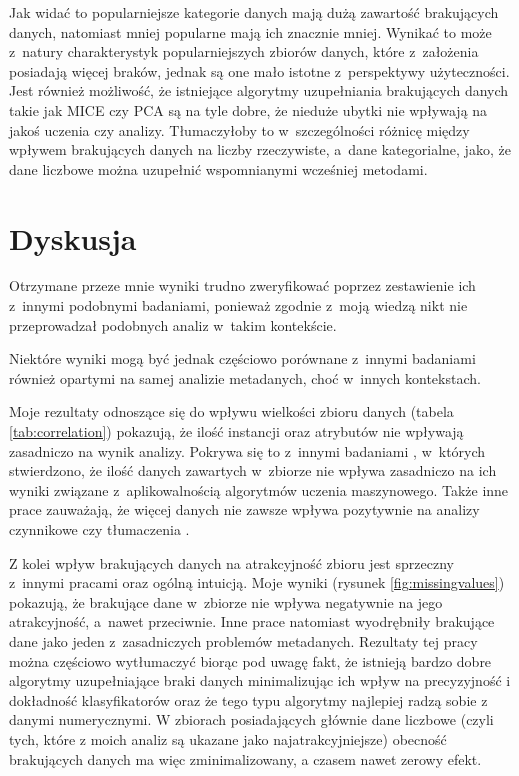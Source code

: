 Jak widać to popularniejsze kategorie danych mają dużą zawartość brakujących danych, natomiast mniej popularne mają ich znacznie mniej.
Wynikać to może z~natury charakterystyk popularniejszych zbiorów danych, które z~założenia posiadają więcej braków, jednak są one mało istotne z~perspektywy użyteczności.
Jest również możliwość, że istniejące algorytmy uzupełniania brakujących danych takie jak MICE czy PCA są na tyle dobre, że nieduże ubytki nie wpływają na jakoś uczenia czy analizy.
Tłumaczyłoby to w~szczególności różnicę między wpływem brakujących danych na liczby rzeczywiste, a~dane kategorialne, jako, że dane liczbowe można uzupełnić wspomnianymi wcześniej metodami.

\section{Dyskusja}

Otrzymane przeze mnie wyniki trudno zweryfikować poprzez zestawienie ich z~innymi podobnymi badaniami, ponieważ zgodnie z~moją wiedzą nikt nie przeprowadzał podobnych analiz w~takim kontekście.

Niektóre wyniki mogą być jednak częściowo porównane z~innymi badaniami również opartymi na samej analizie metadanych, choć w~innych kontekstach.

Moje rezultaty odnoszące się do wpływu wielkości zbioru danych (tabela \ref{tab:correlation}) pokazują, że ilość instancji oraz atrybutów nie wpływają zasadniczo na wynik analizy.
Pokrywa się to z~innymi badaniami \cite{brazdil1994characterizing}, w~których stwierdzono, że ilość danych zawartych w~zbiorze nie wpływa zasadniczo na ich wyniki związane z~aplikowalnością algorytmów uczenia maszynowego.
Także inne prace zauważają, że więcej danych nie zawsze wpływa pozytywnie na analizy czynnikowe \cite{boivin2006more} czy tłumaczenia \cite{gasco2012does}.

Z kolei wpływ brakujących danych na atrakcyjność zbioru jest sprzeczny z~innymi pracami oraz ogólną intuicją.
Moje wyniki (rysunek \ref{fig:missingvalues}) pokazują, że brakujące dane w~zbiorze nie wpływa negatywnie na jego atrakcyjność, a~nawet przeciwnie.
Inne prace \cite{yasser2011analysis} natomiast wyodrębniły brakujące dane jako jeden z~zasadniczych problemów metadanych.
Rezultaty tej pracy można częściowo wytłumaczyć biorąc pod uwagę fakt, że istnieją bardzo dobre algorytmy uzupełniające braki danych minimalizując ich wpływ na precyzyjność i dokładność klasyfikatorów \cite{acuna2004treatment} oraz że tego typu algorytmy najlepiej radzą sobie z danymi numerycznymi.
W zbiorach posiadających głównie dane liczbowe (czyli tych, które z moich analiz są ukazane jako najatrakcyjniejsze) obecność brakujących danych ma więc zminimalizowany, a czasem nawet zerowy efekt.

